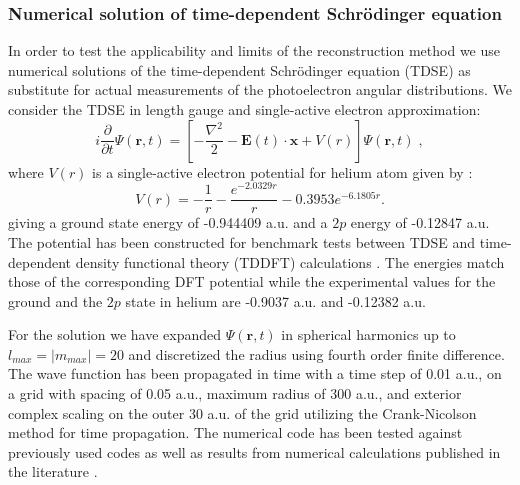 \subsubsection{Numerical solution of time-dependent Schr\"odinger equation}

In order to test the applicability and limits of the reconstruction method we use numerical solutions of the time-dependent Schr\"odinger equation (TDSE) as substitute for actual measurements of the photoelectron angular distributions. We consider the TDSE in length gauge and single-active electron approximation:
%
\begin{equation}
i\frac{\partial}{\partial t}\Psi(\mathbf{r},t) = \left[-\frac{\nabla^2}{2} - \mathbf{E}(t) \cdot \mathbf{x} + V(r)\right]\Psi(\mathbf{r},t)\; ,
\end{equation}
%
where $V(r)$ is a single-active electron potential for helium atom given by \cite{reiff2020}:
%
\begin{equation}
V(r) = -\frac{1}{r} - \frac{e^{-2.0329r}}{r} - 0.3953 e^{-6.1805r}.
\end{equation}
%
giving a ground state energy of -0.944409 a.u. and a $2p$ energy of -0.12847 a.u. The potential has been constructed for benchmark tests between TDSE and time-dependent density functional theory (TDDFT) calculations \cite{reiff2020}. The energies match those of the corresponding DFT potential while the experimental values for the ground and the $2p$ state in helium are -0.9037 a.u. and -0.12382 a.u.

For the solution we have expanded $\Psi(\mathbf{r},t)$ in spherical harmonics up to $l_{max} = |m_{max}| = 20$ and discretized the radius using fourth order finite difference. The wave function has been propagated in time with a time step of 0.01 a.u., on a grid with spacing of 0.05 a.u., maximum radius of 300 a.u., and exterior complex scaling on the outer 30 a.u. of the grid utilizing the Crank-Nicolson method for time propagation. The numerical code has been tested against previously used codes as well as results from numerical calculations published in the literature \cite{Scrinzi2010}.

